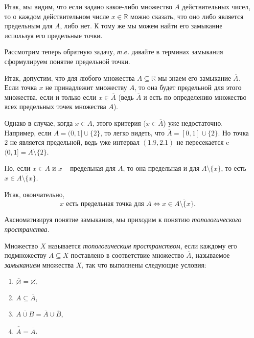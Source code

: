 Итак, мы видим, что если задано какое-либо множество $A$ действительных чисел, то о каждом действительном числе $x\in \mathbb{R}$ можно сказать, что оно либо является предельным для $A$, либо нет. К тому же мы можем найти его замыкание используя его предельные точки. 

Рассмотрим теперь обратную задачу, \textit{т.е.} давайте в терминах замыкания сформулируем понятие предельной точки.

Итак, допустим, что для любого множества $A \subseteq \mathbb{R}$ мы знаем его замыкание $\overline{A}$. Если точка $x$ не принадлежит множеству $A$, то она будет предельной для этого множества, если и только если $x \in \overline{A}$ (ведь $\overline{A}$ и есть по определению множество всех предельных точек множества $A$).

Однако в случае, когда $x \in A$, этого критерия ($x\in \overline{A}$) уже недостаточно. Например, если $A = (0,1]\cup \{2\}$, то легко видеть, что $\overline{A} = [0,1]\cup \{2\}$. Но точка $2$ не является предельной, ведь уже интервал $(1.9, 2.1)$ не пересекается c $(0,1] = A\setminus \{2\}$.

Но, если $x \in A$ и $x$ -- предельная для $A$, то она предельная и для $A \setminus \{x\}$, то есть $x \in \overline{A \setminus \{x\}}.$

Итак, окончательно, 
\[
 \boxed{
  \boxed{ 
    \mbox{$x$ есть предельная точка для $A$} \Longleftrightarrow x \in \overline{A \setminus\{x\}}.
    } 
 }
\]

Аксиоматизируя понятие замыкания, мы приходим к понятию \textit{топологического пространства.}

\begin{definition}
   Множество $X$ называется \textit{топологическим пространством}, если каждому его подмножеству $A \subseteq X$ поставлено в соответствие множество $\overline{A}$, называемое \textit{замыканием} множества $X$, так что выполнены следующие условия:
   \begin{enumerate}
       \item $\overline{ \varnothing} = \varnothing$,
       \item $A \subseteq \overline{A}$,
       \item $\overline{A \cup B} = \overline{A} \cup \overline{B}$,
       \item $\overline{\overline{A}} = \overline{A}$.
   \end{enumerate}
\end{definition}


